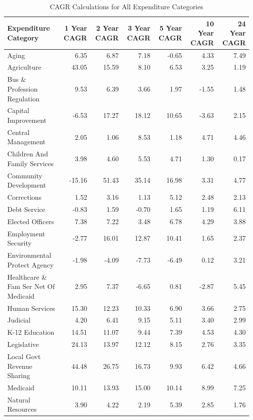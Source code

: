 \documentclass[
  letterpaper,
  DIV=11,
  numbers=noendperiod]{scrreport}
\begin{document}
\begin{table}

\caption{CAGR Calculations for All Expenditure Categories}
\centering
\begin{tabular}[t]{l|r|r|r|r|r|r}
\hline
Expenditure Category & 1 Year CAGR & 2 Year CAGR & 3 Year CAGR & 5 Year CAGR & 10 Year CAGR & 24 Year CAGR\\
\hline
Aging & 6.35 & 6.87 & 7.18 & -0.65 & 4.33 & 7.49\\
\hline
Agriculture & 43.05 & 15.59 & 8.10 & 6.53 & 3.25 & 1.19\\
\hline
Bus \& Profession Regulation & 9.53 & 6.39 & 3.66 & 1.97 & -1.55 & 1.48\\
\hline
Capital Improvement & -6.53 & 17.27 & 18.12 & 10.65 & -3.63 & 2.15\\
\hline
Central Management & 2.05 & 1.06 & 8.53 & 1.18 & 4.71 & 4.46\\
\hline
Children And Family Services & 3.98 & 4.60 & 5.53 & 4.71 & 1.30 & 0.17\\
\hline
Community Development & -15.16 & 51.43 & 35.14 & 16.98 & 3.31 & 4.77\\
\hline
Corrections & 1.52 & 3.16 & 1.13 & 5.12 & 2.48 & 2.13\\
\hline
Debt Service & -0.83 & 1.59 & -0.70 & 1.65 & 1.19 & 6.11\\
\hline
Elected Officers & 7.38 & 7.22 & 3.48 & 6.78 & 4.29 & 3.88\\
\hline
Employment Security & -2.77 & 16.01 & 12.87 & 10.41 & 1.65 & 2.37\\
\hline
Environmental Protect Agency & -1.98 & -4.09 & -7.73 & -6.49 & 0.12 & 3.21\\
\hline
Healthcare \& Fam Ser Net Of Medicaid & 2.95 & 7.37 & -6.65 & 0.81 & -2.87 & 5.45\\
\hline
Human Services & 15.30 & 12.23 & 10.33 & 6.90 & 3.66 & 2.75\\
\hline
Judicial & 4.20 & 6.41 & 9.15 & 5.11 & 3.40 & 2.99\\
\hline
K-12 Education & 14.51 & 11.07 & 9.44 & 7.39 & 4.53 & 4.30\\
\hline
Legislative & 24.13 & 13.97 & 12.12 & 8.15 & 2.76 & 3.35\\
\hline
Local Govt Revenue Sharing & 44.48 & 26.75 & 16.73 & 9.93 & 6.42 & 4.66\\
\hline
Medicaid & 10.11 & 13.93 & 15.00 & 10.14 & 8.99 & 7.25\\
\hline
Natural Resources & 3.90 & 4.22 & 2.19 & 5.39 & 2.85 & 1.76\\

\end{tabular}
\end{table}
\end{document}
